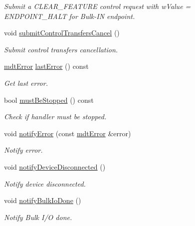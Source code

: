 \begin{DoxyCompactItemize}
\begin{DoxyCompactList}\small\item\em Submit a C\-L\-E\-A\-R\-\_\-\-F\-E\-A\-T\-U\-R\-E control request with w\-Value = E\-N\-D\-P\-O\-I\-N\-T\-\_\-\-H\-A\-L\-T for Bulk-\/\-I\-N endpoint. \end{DoxyCompactList}\item 
void \hyperlink{classmdt_usbtmc_transfer_handler_a902d37d0866ff5165d3b17f4257c8efd}{submit\-Control\-Transfers\-Cancel} ()
\begin{DoxyCompactList}\small\item\em Submit control transfers cancellation. \end{DoxyCompactList}\item 
\hyperlink{classmdt_error}{mdt\-Error} \hyperlink{classmdt_usbtmc_transfer_handler_aa89e3f0c2f44611fc82b9dd59dabd266}{last\-Error} () const 
\begin{DoxyCompactList}\small\item\em Get last error. \end{DoxyCompactList}\item 
bool \hyperlink{classmdt_usbtmc_transfer_handler_ae2413dcf8b609a0d306f29f30510f053}{must\-Be\-Stopped} () const 
\begin{DoxyCompactList}\small\item\em Check if handler must be stopped. \end{DoxyCompactList}\item 
void \hyperlink{classmdt_usbtmc_transfer_handler_abd9c56a78fd329118221ee513075c6c2}{notify\-Error} (const \hyperlink{classmdt_error}{mdt\-Error} \&error)
\begin{DoxyCompactList}\small\item\em Notify error. \end{DoxyCompactList}\item 
void \hyperlink{classmdt_usbtmc_transfer_handler_a05ec728c24b005456389ad52c98f6fdd}{notify\-Device\-Disconnected} ()
\begin{DoxyCompactList}\small\item\em Notify device disconnected. \end{DoxyCompactList}\item 
void \hyperlink{classmdt_usbtmc_transfer_handler_a1ebfb78e95382f276244622d77a96cf4}{notify\-Bulk\-Io\-Done} ()
\begin{DoxyCompactList}\small\item\em Notify Bulk I/\-O done. \end{DoxyCompactList}\item 

\end{DoxyCompactItemize}
